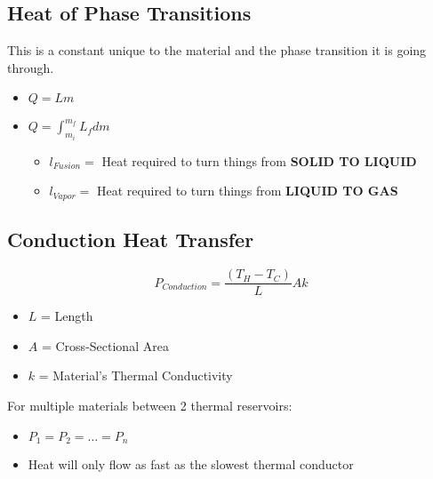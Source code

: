 	\subsection*{Heat of Phase Transitions} \label{subec:Heat Phase Transitions}
	This is a constant unique to the material and the phase transition it is going through.
	\begin{itemize}[nolistsep]
		\item $Q = Lm$
		\item $Q = \int_{m_{i}}^{m_{f}} L_{f} dm$
		\begin{itemize}[noitemsep, nolistsep]
			\item $l_{Fusion} = $ Heat required to turn things from \textbf{SOLID TO LIQUID}
			\item $l_{Vapor} = $ Heat required to turn things from \textbf{LIQUID TO GAS}
		\end{itemize}
	\end{itemize}

	\subsection*{Conduction Heat Transfer} \label{subsec:Conduction Heat Transfer}
	\begin{equation} \label{eq:Conduction Heat Transfer}
		P_{Conduction} = \frac{\left( T_{H} - T_{C} \right)}{L} Ak
	\end{equation}
		\begin{itemize}[noitemsep, nolistsep]
			\item $L$ = Length
			\item $A$ = Cross-Sectional Area
			\item $k$ = Material's Thermal Conductivity
		\end{itemize}
	For multiple materials between 2 thermal reservoirs:
	\begin{itemize}[noitemsep, nolistsep]
		\item $P_{1} = P_{2} = \ldots = P_{n}$
		\item Heat will only flow as fast as the slowest thermal conductor
	\end{itemize}
